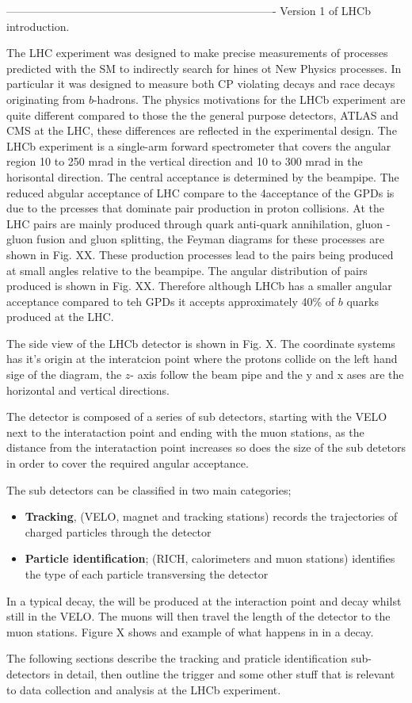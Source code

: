 -------------------------------------------------------------------------
Version 1 of LHCb introduction.

The LHC experiment was designed to make precise measurements of processes predicted with the SM to indirectly search for hines ot New Physics processes. %
In particular it was designed to measure both CP violating decays and race decays originating from $b$-hadrons. The physics motivations for the LHCb experiment are quite different compared to those the the general purpose detectors, ATLAS and CMS at the LHC, these differences are reflected in the experimental design. The LHCb experiment is a single-arm forward spectrometer that covers the angular region 10 to 250 mrad in the vertical direction and 10 to 300 mrad in the horisontal direction. The central acceptance is determined by the beampipe. The reduced abgular acceptance of LHC compare to the 4\pi acceptance of the GPDs is due to the prcesses that dominate \bbbar pair production in proton collisions. At the LHC \bbbar pairs are mainly produced through quark anti-quark annihilation, gluon - gluon fusion and gluon splitting, the Feyman diagrams for these processes are shown in Fig. XX. %
These production processes lead to the \bbbar pairs being produced at small angles relative to the beampipe. The angular distribution of \bbbar pairs produced is shown in Fig. XX. Therefore although LHCb has a smaller angular acceptance compared to teh GPDs it accepts approximately 40\% of $b$ quarks produced at the LHC.

The side view of the LHCb detector is shown in Fig. X. The coordinate systems has it's origin at the interatcion point where the protons collide on the left hand sige of the diagram, the $z$- axis follow the beam pipe and the y and x ases are the horizontal and vertical directions. 

The detector is composed of a series of sub detectors, starting with the VELO next to the interataction point and ending with the muon stations, as the distance from the interataction point increases so does the size of the sub detetors in order to cover the required angular acceptance.

The sub detectors can be classified in two main categories;
\begin{itemize}
\item {\bf Tracking}, (VELO, magnet and tracking stations) records the trajectories of charged particles through the detector
\item {\bf Particle identification}; (RICH, calorimeters and muon stations) identifies the type of each particle transversing the detector
\end{itemize}

In a typical \bsmumu decay, the \bs will be produced at the interaction point and decay whilst still in the VELO. The muons will then travel the length of the detector to the muon stations. Figure X shows and example of what happens in in a \bsmumu decay.

The following sections describe the tracking and praticle identification sub-detectors in detail, then outline the trigger and some other stuff that is relevant to data collection and analysis at the LHCb experiment. 
